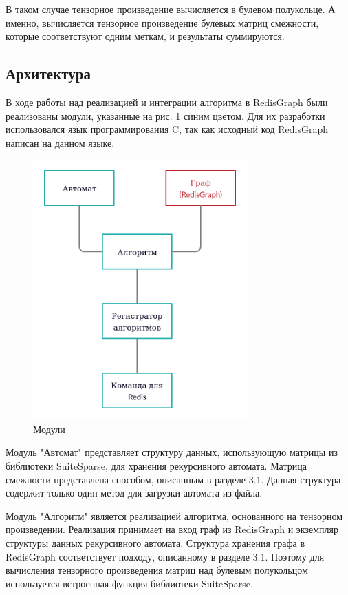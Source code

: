\documentclass[14pt]{matmex-diploma}
\theoremstyle{definition}
\begin{document}
\bigskip

В таком случае тензорное произведение вычисляется в булевом полукольце. А именно, вычисляется тензорное произведение булевых матриц смежности, которые соответствуют одним меткам, и результаты суммируются. 

\subsection{Архитектура}

В ходе работы над реализацией и интеграции алгоритма в RedisGraph были реализованы модули, указанные на рис. 1 синим цветом. Для их разработки использовался язык программирования C, так как исходный код RedisGraph написан на данном языке.

\begin{figure}[h]
\begin{center}
     \includegraphics[height=10cm]{diagram.jpg}
     \caption{Модули}
\end{center}
\end{figure}

Модуль "Автомат" представляет структуру данных, использующую матрицы из библиотеки SuiteSparse, для хранения рекурсивного автомата. Матрица смежности представлена способом, описанным в разделе 3.1. Данная структура содержит только один метод для загрузки автомата из файла.

Модуль "Алгоритм" является реализацией алгоритма, основанного на тензорном произведении. Реализация принимает на вход граф из RedisGraph и экземпляр структуры данных рекурсивного автомата. Структура хранения графа в RedisGraph соответствует подходу, описанному в разделе 3.1. Поэтому для вычисления тензорного произведения матриц над булевым полукольцом используется встроенная функция библиотеки SuiteSparse.
\end{document}

